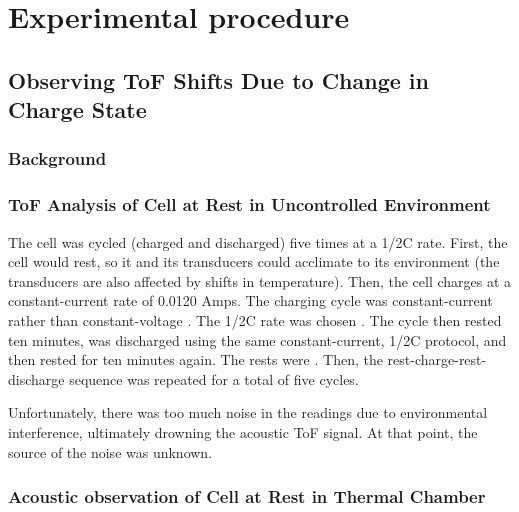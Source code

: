 \chapter{Experimental procedure}

\section{Observing ToF Shifts Due to Change in Charge State}

\subsection{Background}

\subsection{ToF Analysis of Cell at Rest in Uncontrolled Environment}

The cell was cycled (charged and discharged) five times at a 1/2C rate. First, the cell would rest, so it and its transducers could acclimate to its environment (the transducers are also affected by shifts in temperature). Then, the cell charges at a constant-current rate of 0.0120 Amps. The charging cycle was constant-current rather than constant-voltage . The 1/2C rate was chosen . The cycle then rested ten minutes, was discharged using the same constant-current, 1/2C protocol, and then rested for ten minutes again. The rests were . Then, the rest-charge-rest-discharge sequence was repeated for a total of five cycles.


Unfortunately, there was too much noise in the readings due to environmental interference, ultimately drowning the acoustic ToF signal. At that point, the source of the noise was unknown.

    
\subsection{Acoustic observation of Cell at Rest in Thermal Chamber}


